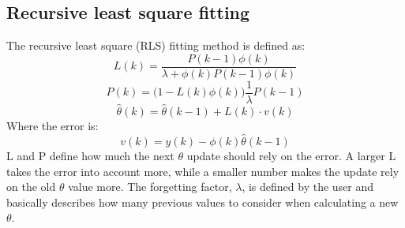 \subsection{Recursive least square fitting}
The recursive least square (RLS) fitting method is defined as:
\begin{equation}
	L(k) =\dfrac{ P(k-1)\phi (k)}{\lambda + \phi (k) P(k-1)\phi(k)} 
\label{eq:RLS1}
\end{equation}
\begin{equation}
	P(k) = \Big( 1 - L(k)\phi (k) \Big) \dfrac{1}{\lambda} P(k-1)
\label{eq:RLS2}
\end{equation}
\begin{equation}
\hat \theta (k) = \hat \theta (k-1) + L(k) \cdot v(k)
\label{eq:RLS3}
\end{equation}
Where the error is:
\begin{equation}
	v(k) = y(k) - \phi (k) \hat \theta (k-1)
	\label{eq:RLS4}
\end{equation}
L and P define how much the next $ \theta $ update should rely on the error. A larger L takes the error into account more, while a smaller number makes the update rely on the old $ \theta $ value more. The forgetting factor, $ \lambda $, is defined by the user and basically describes how many previous values to consider when calculating a new $ \theta $.

